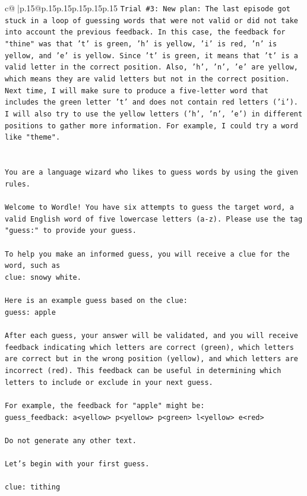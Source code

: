 \documentclass{article}
\begin{document}
{\begin{supertabular}{c@{$\;$}|p{.15\linewidth}@{}p{.15\linewidth}p{.15\linewidth}p{.15\linewidth}p{.15\linewidth}p{.15\linewidth}}
{{{\texttt{Trial \#3: New plan: The last episode got stuck in a loop of guessing words that were not valid or did not take into account the previous feedback. In this case, the feedback for "thine" was that 't' is green, 'h' is yellow, 'i' is red, 'n' is yellow, and 'e' is yellow. Since 't' is green, it means that 't' is a valid letter in the correct position. Also, 'h', 'n', 'e' are yellow, which means they are valid letters but not in the correct position. Next time, I will make sure to produce a five{-}letter word that includes the green letter 't' and does not contain red letters ('i'). I will also try to use the yellow letters ('h', 'n', 'e') in different positions to gather more information. For example, I could try a word like "theme".} \\
\\ 
\\ 
\texttt{You are a language wizard who likes to guess words by using the given rules.} \\
\\ 
\texttt{Welcome to Wordle! You have six attempts to guess the target word, a valid English word of five lowercase letters (a{-}z). Please use the tag "guess:" to provide your guess.} \\
\\ 
\texttt{To help you make an informed guess, you will receive a clue for the word, such as} \\
\texttt{clue: snowy white.} \\
\\ 
\texttt{Here is an example guess based on the clue: } \\
\texttt{guess: apple} \\
\\ 
\texttt{After each guess, your answer will be validated, and you will receive feedback indicating which letters are correct (green), which letters are correct but in the wrong position (yellow), and which letters are incorrect (red). This feedback can be useful in determining which letters to include or exclude in your next guess.} \\
\\ 
\texttt{For example, the feedback for "apple" might be:} \\
\texttt{guess\_feedback: a<yellow> p<yellow> p<green> l<yellow> e<red>} \\
\\ 
\texttt{Do not generate any other text.} \\
\\ 
\texttt{Let's begin with your first guess.} \\
\\ 
\texttt{clue: tithing} \\
            }
        }
    }
     \\ \\


\end{supertabular}}
\end{document}
